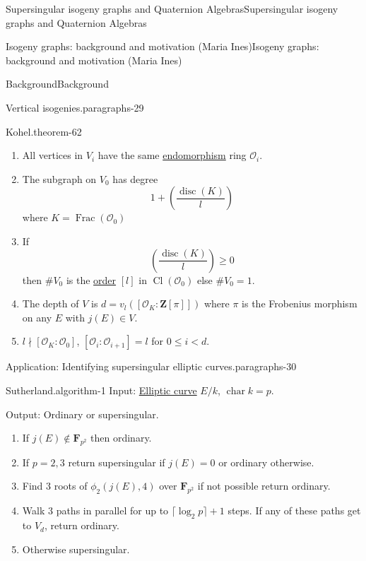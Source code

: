 \documentclass[10pt,]{book}
\numberwithin{equation}{section}
\newcommand{\lb}{[}
\newcommand{\rb}{]}
\newcommand{\ZZ}{\mathbf{Z}}
\newcommand{\FF}{\mathbf{F}}
\newcommand{\ints}{\mathcal{O}}
\DeclareMathOperator{\Cl}{Cl}
\DeclareMathOperator{\disc}{disc}
\DeclareMathOperator{\characteristic}{char}
\DeclareMathOperator{\Frac}{Frac}
\newcommand{\lt}{<}
\begin{document}
\begin{chapterptx}{Supersingular isogeny graphs and Quaternion Algebras}{}{Supersingular isogeny graphs and Quaternion Algebras}{}{}
\begin{sectionptx}{Isogeny graphs: background and motivation (Maria Ines)}{}{Isogeny graphs: background and motivation (Maria Ines)}{}{}
\begin{subsectionptx}{Background}{}{Background}{}{}
\begin{paragraphs}{Vertical isogenies.}{paragraphs-29}
\begin{theorem}{Kohel.}{}{theorem-62}
\begin{enumerate}
\item\hypertarget{li-200}{}All vertices in \(V_i\) have the same \hyperref[def-supersing-isog-endo]{endomorphism} ring \(\ints_i\).%
\item\hypertarget{li-201}{}The subgraph on \(V_0\) has degree%
\begin{equation*}
1+ \left(\frac {\disc(K)}{l}\right)
\end{equation*}
where \(K = \Frac(\ints_0)\)%
\item\hypertarget{li-202}{}If%
\begin{equation*}
\left(\frac {\disc(K)}{l}\right) \ge 0
\end{equation*}
then \(\#V_0\) is the \hyperref[def-order-quaternion]{order} \(\lb l \rb\) in \(\Cl (\ints_0)\) else \(\#V_0 = 1\).%
\item\hypertarget{li-203}{}The depth of \(V\) is \(d = v_l (\lb \ints_K : \ZZ\lb\pi \rb\rb)\) where \(\pi\) is the Frobenius morphism on any \(E\) with \(j(E) \in V\).%
\item\hypertarget{li-204}{}\(l \nmid \lb \ints_K : \ints_0 \rb\), \(\lb \ints_i : \ints_{i+1}\rb = l\) for \(0\le i \lt d\).%
\end{enumerate}
%
\end{theorem}
\end{paragraphs}%
\begin{paragraphs}{Application: Identifying supersingular elliptic curves.}{paragraphs-30}%
\begin{algorithm}{Sutherland.}{}{algorithm-1}%
\hypertarget{p-820}{}%
Input: \hyperref[def-supersing-isog-ec]{Elliptic curve} \(E/k\), \(\characteristic k = p\).%
\par
\hypertarget{p-821}{}%
Output: Ordinary or supersingular.%
\par
\hypertarget{p-822}{}%
\leavevmode%
\begin{enumerate}
\item\hypertarget{li-205}{}If \(j(E) \not \in \FF_{p^2}\) then ordinary.%
\item\hypertarget{li-206}{}If \(p  =2,3\) return supersingular if \(j(E) = 0\) or ordinary otherwise.%
\item\hypertarget{li-207}{}Find 3 roots of \(\phi_2(j(E), 4)\) over \(\FF_{p^2}\) if not possible return ordinary.%
\item\hypertarget{li-208}{}Walk 3 paths in parallel for up to \(\lceil \log_2 p \rceil + 1 \) steps. If any of these paths get to \(V_d\), return ordinary.%
\item\hypertarget{li-209}{}Otherwise supersingular.%

\end{enumerate}
\end{algorithm}
\end{paragraphs}
\end{subsectionptx}
\end{sectionptx}
\end{chapterptx}
\end{document}
